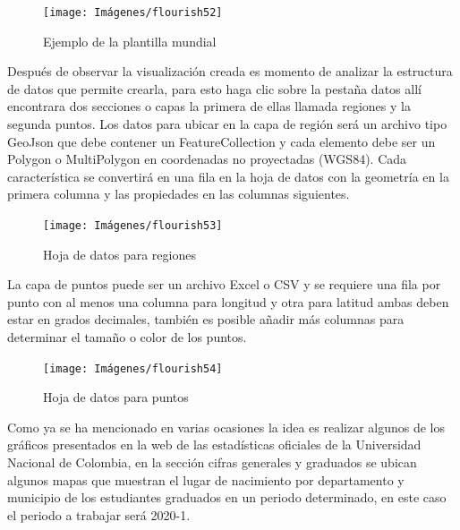 \documentclass[
]{book}
\begin{document}
\begin{figure}

{\centering \texttt{[image: Imágenes/flourish52]} 

}

\caption{Ejemplo de la plantilla mundial}\label{fig:ejemplomapamundoflourish-fig}
\end{figure}

Después de observar la visualización creada es momento de analizar la estructura de datos que permite crearla, para esto haga clic sobre la pestaña datos allí encontrara dos secciones o capas la primera de ellas llamada regiones y la segunda puntos. Los datos para ubicar en la capa de región será un archivo tipo GeoJson que debe contener un FeatureCollection y cada elemento debe ser un Polygon o MultiPolygon en coordenadas no proyectadas (WGS84). Cada característica se convertirá en una fila en la hoja de datos con la geometría en la primera columna y las propiedades en las columnas siguientes.

\begin{figure}

{\centering \texttt{[image: Imágenes/flourish53]} 

}

\caption{Hoja de datos para regiones}\label{fig:hojaregionesflourish-fig}
\end{figure}

La capa de puntos puede ser un archivo Excel o CSV y se requiere una fila por punto con al menos una columna para longitud y otra para latitud ambas deben estar en grados decimales, también es posible añadir más columnas para determinar el tamaño o color de los puntos.

\begin{figure}

{\centering \texttt{[image: Imágenes/flourish54]} 

}

\caption{Hoja de datos para puntos}\label{fig:hojapuntosflourish-fig}
\end{figure}

Como ya se ha mencionado en varias ocasiones la idea es realizar algunos de los gráficos presentados en la web de las estadísticas oficiales de la Universidad Nacional de Colombia, en la sección cifras generales y graduados se ubican algunos mapas que muestran el lugar de nacimiento por departamento y municipio de los estudiantes graduados en un periodo determinado, en este caso el periodo a trabajar será 2020-1.
\end{document}

